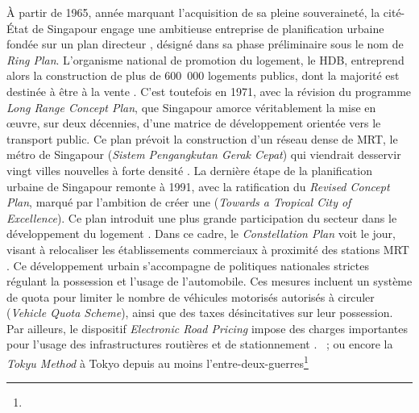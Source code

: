 \begin{refsegment}
{    À partir de 1965, année marquant l'acquisition de sa pleine souveraineté, la cité-État de Singapour engage une ambitieuse entreprise de planification urbaine fondée sur un plan directeur \textcolor{blue}{\autocite[p.~155-179 (chapitre 6)]{cervero_transit_1998}}, désigné dans sa phase préliminaire sous le nom de \textsl{Ring Plan}. L'organisme national de promotion du logement, le \acrfull{HDB}, entreprend alors la construction de plus de 600~000 logements publics, dont la majorité est destinée à être à la vente \textcolor{blue}{\autocite[167]{guillot_singapour_2007}}. C'est toutefois en 1971, avec la révision du programme \textsl{Long Range Concept Plan}, que Singapour amorce véritablement la mise en œuvre, sur deux décennies, d'une matrice de développement orientée vers le transport public. Ce plan prévoit la construction d'un réseau dense de \acrfull{MRT}, le métro de Singapour (\textsl{Sistem Pengangkutan Gerak Cepat}) qui viendrait desservir vingt villes nouvelles à forte densité \textcolor{blue}{\autocite[162]{cervero_transit_1998}}. La dernière étape de la planification urbaine de Singapour remonte à 1991, avec la ratification du \textsl{Revised Concept Plan}, marqué par l'ambition de créer une  (\textsl{Towards a Tropical City of Excellence}). Ce plan introduit une plus grande participation du secteur dans le développement du logement \textcolor{blue}{\autocite[168]{guillot_singapour_2007}}. Dans ce cadre, le \textsl{Constellation Plan} voit le jour, visant à relocaliser les établissements commerciaux à proximité des stations \acrshort{MRT} \textcolor{blue}{\autocite[362]{richmond_transporting_2008}}. Ce développement urbain s'accompagne de politiques nationales strictes régulant la  possession et l'usage de l'automobile. Ces mesures incluent un système de quota pour limiter le nombre de véhicules motorisés autorisés à circuler (\textsl{Vehicle Quota Scheme}), ainsi que des taxes désincitatives sur leur possession. Par ailleurs, le dispositif \textsl{Electronic Road Pricing} impose des charges importantes pour l'usage des infrastructures routières et de stationnement \textcolor{blue}{\autocite[162]{joshi_transit-oriented_2017}}.
}~; ou encore la \textsl{Tokyu Method} à Tokyo depuis au moins l'entre-deux-guerres\footnote{
}
\end{refsegment}
